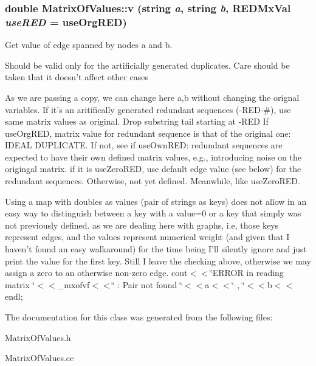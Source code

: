 \subsubsection{\setlength{\rightskip}{0pt plus 5cm}double Matrix\-Of\-Values::v (string {\em a}, string {\em b}, REDMx\-Val {\em use\-RED} = use\-Org\-RED)}\label{classMatrixOfValues_a17}


Get value of edge spanned by nodes a and b. 

Should be valid only for the artificially generated duplicates. Care should be taken that it doesn't affect other cases

As we are passing a copy, we can change here a,b without changing the orignal variables. If it's an aritifically generated redundant sequences (-RED-\#), use same matrix values as original. Drop substring tail starting at -RED If use\-Org\-RED, matrix value for redundant sequence is that of the original one: IDEAL DUPLICATE. If not, see if use\-Own\-RED: redundant sequences are expected to have their own defined matrix values, e.g., introducing noise on the origingal matrix. if it is use\-Zero\-RED, use default edge value (see below) for the redundant sequences. Otherwise, not yet defined. Meanwhile, like use\-Zero\-RED.

Using a map with doubles as values (pair of strings as keys) does not allow in an easy way to distinguish between a key with a value=0 or a key that simply was not previously defined. as we are dealing here with graphs, i.e, those keys represent edges, and the values represent numerical weight (and given that I haven't found an easy walkaround) for the time being I'll silently ignore and just print the value for the first key. Still I leave the checking above, otherwise we may assign a zero to an otherwise non-zero edge. cout$<$$<$\char`\"{}ERROR in reading matrix \char`\"{}$<$$<$\_\-mxofvf$<$$<$\char`\"{} : Pair not found \char`\"{}$<$$<$a$<$$<$\char`\"{} , \char`\"{}$<$$<$b$<$$<$endl; 

The documentation for this class was generated from the following files:\begin{CompactItemize}
\item 
Matrix\-Of\-Values.h\item 
Matrix\-Of\-Values.cc\end{CompactItemize}
